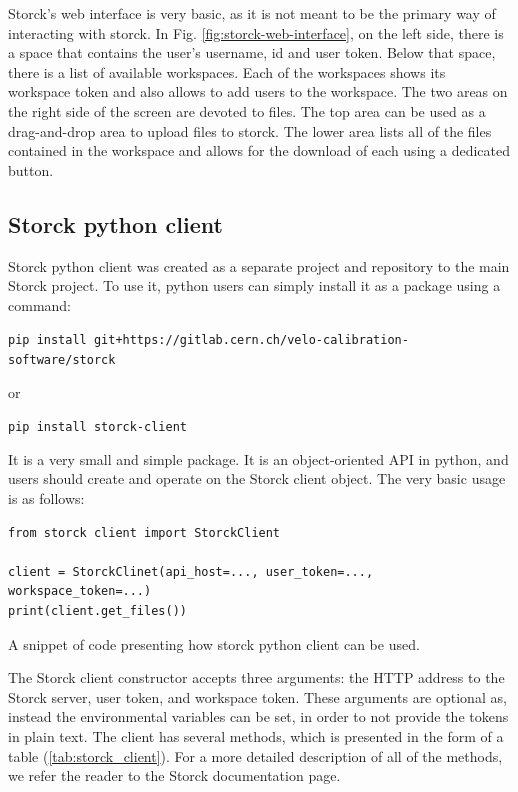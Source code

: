 Storck's web interface is very basic, as it is not meant to be the primary way of interacting with storck.
In Fig. \ref{fig:storck-web-interface}, on the left side, there is a space that contains the user's username, id and user token.
Below that space, there is a list of available workspaces.
Each of the workspaces shows its workspace token and also allows to add users to the workspace.
The two areas on the right side of the screen are devoted to files.
The top area can be used as a drag-and-drop area to upload files to storck.
The lower area lists all of the files contained in the workspace and allows for the download of each using a dedicated button.


\subsection{Storck python client}

Storck python client was created as a separate project and repository to the main Storck project.
To use it, python users can simply install it as a package using a command:

\texttt{pip install git+https://gitlab.cern.ch/velo-calibration-software/storck}

or

\texttt{pip install storck-client}

\noindent It is a very small and simple package. It is an object-oriented API in python, and users should create and operate on the Storck client object.
The very basic usage is as follows:


\begin{listing}[!ht]
\begin{verbatim}
from storck client import StorckClient

client = StorckClinet(api_host=..., user_token=..., workspace_token=...)
print(client.get_files())

\end{verbatim}
\caption{A snippet of code presenting how storck python client can be used.}
\label{listing:storck_client}
\end{listing}

The Storck client constructor accepts three arguments: the HTTP address to the Storck server, user token, and workspace token.
These arguments are optional as, instead the environmental variables can be set, in order to not provide the tokens in plain text.
The client has several methods, which is presented in the form of a table (\ref{tab:storck_client}).
For a more detailed description of all of the methods, we refer the reader to the Storck documentation page\cite{storckdock}.


